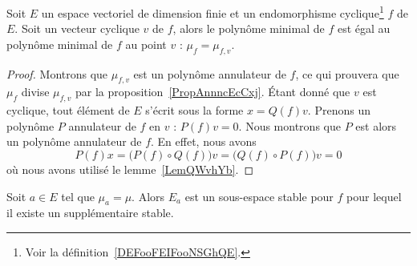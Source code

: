 \begin{lemma}   \label{LemAGZNNa}
    Soit \( E\) un espace vectoriel de dimension finie et un endomorphisme cyclique\footnote{Voir la définition~\ref{DEFooFEIFooNSGhQE}.} \( f\) de \( E\). Soit un vecteur cyclique \( v\) de \( f\), alors le polynôme minimal de \( f\) est égal au polynôme minimal de \( f\) au point \( v\) : \( \mu_{f}=\mu_{f,v}\).
\end{lemma}

\begin{proof}
    Montrons que \( \mu_{f,v}\) est un polynôme annulateur de \( f\), ce qui prouvera que \( \mu_f\) divise \( \mu_{f,v}\) par la proposition~\ref{PropAnnncEcCxj}. Étant donné que \( v\) est cyclique, tout élément de \( E\) s'écrit sous la forme \( x=Q(f)v\). Prenons un polynôme \( P\) annulateur de \( f\) en \( v\) : \( P(f)v=0\). Nous montrons que \( P\) est alors un polynôme annulateur de \( f\). En effet, nous avons
    \begin{equation}
        P(f)x=\big( P(f)\circ Q(f) \big)v=\big( Q(f)\circ P(f) \big)v=0
    \end{equation}
    où nous avons utilisé le lemme~\ref{LemQWvhYb}.
\end{proof}

\begin{lemma}
    Soit \( a\in E\) tel que \( \mu_a=\mu\). Alors \( E_a\) est un sous-espace stable pour \( f\) pour lequel il existe un supplémentaire stable.
\end{lemma}

